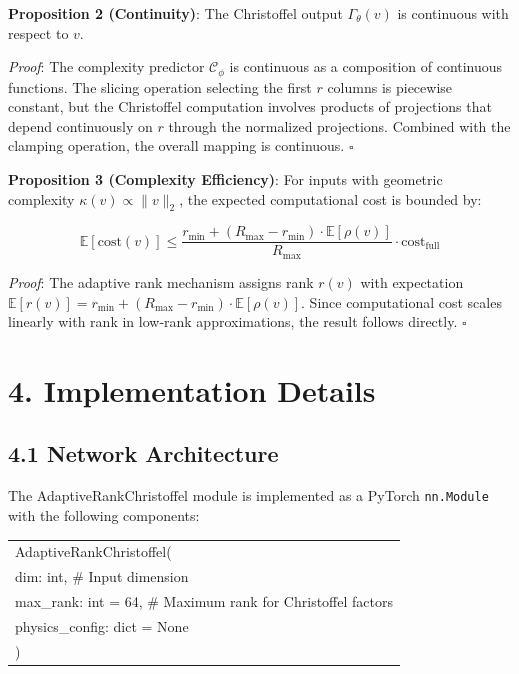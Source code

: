 \documentclass[12pt]{article}
\begin{document}
\textbf{Proposition 2 (Continuity)}: The Christoffel output $\Gamma_\theta(v)$ is continuous with respect to $v$.

\textit{Proof}: The complexity predictor $\mathcal{C}_\phi$ is continuous as a composition of continuous functions. The slicing operation selecting the first $r$ columns is piecewise constant, but the Christoffel computation involves products of projections that depend continuously on $r$ through the normalized projections. Combined with the clamping operation, the overall mapping is continuous. $\square$

\textbf{Proposition 3 (Complexity Efficiency)}: For inputs with geometric complexity $\kappa(v) \propto \|v\|_2$, the expected computational cost is bounded by:

\begin{equation}
\mathbb{E}[\text{cost}(v)] \leq \frac{r_{\min} + (R_{\max} - r_{\min}) \cdot \mathbb{E}[\rho(v)]}{R_{\max}} \cdot \text{cost}_{\text{full}}
\end{equation}

\textit{Proof}: The adaptive rank mechanism assigns rank $r(v)$ with expectation $\mathbb{E}[r(v)] = r_{\min} + (R_{\max} - r_{\min}) \cdot \mathbb{E}[\rho(v)]$. Since computational cost scales linearly with rank in low-rank approximations, the result follows directly. $\square$

\section{4. Implementation Details}

\subsection{4.1 Network Architecture}

The AdaptiveRankChristoffel module is implemented as a PyTorch \texttt{nn.Module} with the following components:

\begin{center}
\begin{tabular}{|l|}
\hline
AdaptiveRankChristoffel( \\
\quad dim: int,           \# Input dimension \\
\quad max\_rank: int = 64, \# Maximum rank for Christoffel factors \\
\quad physics\_config: dict = None \\
) \\
\hline
\end{tabular}
\end{center}
\end{document}

